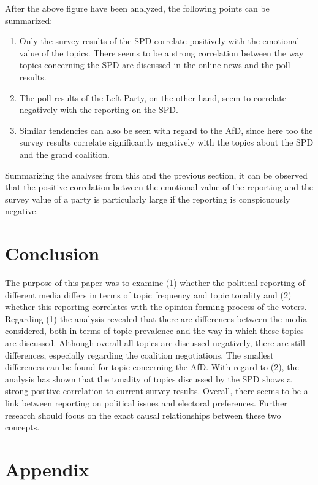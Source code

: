 \documentclass[12pt,a4paper,notitlepage]{article}
\begin{document}
After the above figure have been analyzed, the following points can be summarized:

\begin{enumerate}
	\item Only the survey results of the SPD correlate positively with the emotional value of the topics. There seems to be a strong correlation between the way topics concerning the SPD are discussed in the online news and the poll results.  
	\item The poll results of the Left Party, on the other hand, seem to correlate negatively with the reporting on the SPD. 
	\item Similar tendencies can also be seen with regard to the AfD, since here too the survey results correlate significantly negatively with the topics about the SPD and the grand coalition. 
\end{enumerate} 

Summarizing the analyses from this and the previous section, it can be observed that the positive correlation between the emotional value of the reporting and the survey value of a party is particularly large if the reporting is conspicuously negative. 

\section{Conclusion}

The purpose of this paper was to examine (1) whether the political reporting of different media differs in terms of topic frequency and topic tonality and (2) whether this reporting correlates with the opinion-forming process of the voters. Regarding (1) the analysis revealed that there are differences between the media considered, both in terms of topic prevalence and the way in which these topics are discussed. Although overall all topics are discussed negatively, there are still differences, especially regarding the coalition negotiations. The smallest differences can be found for topic concerning the AfD. With regard to (2), the analysis has shown that the tonality of topics discussed by the SPD shows a strong positive correlation to current survey results. Overall, there seems to be a link between reporting on political issues and electoral preferences. Further research should focus on the exact causal relationships between these two concepts. 

\printbibliography
\section*{Appendix}
\end{document}

